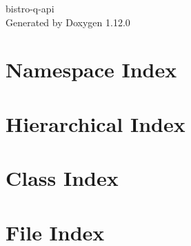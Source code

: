 \documentclass[twoside]{book}
\newcommand{\+}{\discretionary{\mbox{\scriptsize$\hookleftarrow$}}{}{}}
\newcommand{\clearemptydoublepage}{%
    \newpage{\pagestyle{empty}\cleardoublepage}%
  }
\begin{document}
  \raggedbottom
    \hypersetup{pageanchor=false,
                bookmarksnumbered=true,
                pdfencoding=unicode
               }
  \begin{titlepage}
  \vspace*{7cm}
  \begin{center}%
  {\Large bistro-\/q-\/api}\\
  \vspace*{1cm}
  {\large Generated by Doxygen 1.12.0}\\
  \end{center}
  \end{titlepage}
  \clearemptydoublepage
  \tableofcontents
  \clearemptydoublepage
  \hypersetup{pageanchor=true}

\chapter{Namespace Index}

\chapter{Hierarchical Index}

\chapter{Class Index}

\chapter{File Index}

\end{document}
